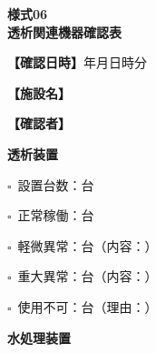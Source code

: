 \documentclass[a4paper,12pt]{jarticle}
\newcommand{\checkbox}{$\square$\ }
\newcommand{\underlinespace}[1]{\underline{\hspace{#1}}}
\begin{document}
\begin{center}
{\Large\textbf{様式06}}\\
\vspace{3mm}
{\Large\textbf{透析関連機器確認表}}
\end{center}
\vspace{5mm}

\noindent
\textbf{【確認日時】}\underlinespace{2cm}年\underlinespace{1cm}月\underlinespace{1cm}日\underlinespace{1cm}時\underlinespace{1cm}分

\vspace{3mm}

\noindent
\textbf{【施設名】} \underlinespace{10cm}

\vspace{3mm}

\noindent
\textbf{【確認者】} \underlinespace{10cm}

\vspace{8mm}

\begin{center}
\textbf{\large 透析装置}
\end{center}

\vspace{3mm}

\noindent
\checkbox 設置台数：\underlinespace{2cm}台

\vspace{2mm}

\noindent
\checkbox 正常稼働：\underlinespace{2cm}台

\vspace{2mm}

\noindent
\checkbox 軽微異常：\underlinespace{2cm}台（内容：\underlinespace{6cm}）

\vspace{2mm}

\noindent
\checkbox 重大異常：\underlinespace{2cm}台（内容：\underlinespace{6cm}）

\vspace{2mm}

\noindent
\checkbox 使用不可：\underlinespace{2cm}台（理由：\underlinespace{6cm}）

\vspace{8mm}

\begin{center}
\textbf{\large 水処理装置}
\end{center}

\vspace{3mm}
\end{document}
